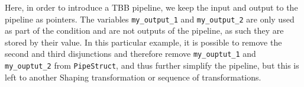 %
\noindent
Here, in order to introduce a TBB pipeline, we keep the input and output to the pipeline as pointers. The variables \lstinline|my_output_1| and \lstinline|my_output_2| are only used as part of the condition and are not outputs of the pipeline, as such they are stored by their value. In this particular example, it is possible to remove the second and third disjunctions and therefore remove \lstinline|my_ouptut_1| and \lstinline|my_ouptut_2| from \lstinline|PipeStruct|, and thus further simplify the pipeline, but this is left to another Shaping transformation or sequence of transformations.

%
